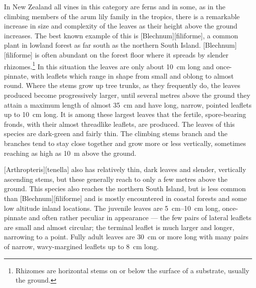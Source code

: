 In New Zealand all vines in this category are ferns and in some, as in the climbing members of the arum lily family in the tropics, there is a remarkable increase in size and complexity of the leaves as their height above the ground increases.
The best known example of this is [Blechnum][filiforme], a common plant in lowland forest as far south as the northern South Island. [Blechnum][filiforme] is often abundant on the forest floor where it spreads by slender rhizomes.\footnote{Rhizomes are horizontal stems on or below the surface of a substrate, usually the ground.}
In this situation the leaves are only about \SI{10}{\centi\metre} long and once-pinnate, with leaflets which range in shape from small and oblong to almost round.
Where the stems grow up tree trunks, as they frequently do, the leaves produced become progressively larger, until several metres above the ground they attain a maximum length of almost \SI{35}{\centi\metre} and have long, narrow, pointed leaflets up to \SI{10}{\centi\metre} long.
It is among these largest leaves that the fertile, spore-bearing fronds, with their almost threadlike leaflets, are produced.
The leaves of this species are dark-green and fairly thin.
The climbing stems branch and the branches tend to stay close together and grow more or less vertically, sometimes reaching as high as \SI{10}{\metre} above the ground.

[Arthropteris][tenella] also has relatively thin, dark leaves and slender, vertically ascending stems, but these generally reach to only a few metres above the ground.
This species also reaches the northern South Island, but is less common than [Blechnum][filiforme] and is mostly encountered in coastal forests and some low altitude inland locations.
The juvenile leaves are \SIrange{5}{10}{\centi\metre} long, once-pinnate and often rather peculiar in appearance --- the few pairs of lateral leaflets are small and almost circular; the terminal leaflet is much larger and longer, narrowing to a point.
Fully adult leaves are \SI{30}{\centi\metre} or more long with many pairs of narrow, wavy-margined leaflets up to \SI{8}{\centi\metre} long.

